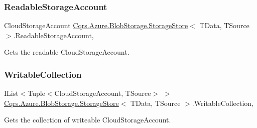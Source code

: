 \subsubsection{\texorpdfstring{Readable\+Storage\+Account}{ReadableStorageAccount}}
{\footnotesize\ttfamily Cloud\+Storage\+Account \hyperlink{classCqrs_1_1Azure_1_1BlobStorage_1_1StorageStore}{Cqrs.\+Azure.\+Blob\+Storage.\+Storage\+Store}$<$ T\+Data, T\+Source $>$.Readable\+Storage\+Account\hspace{0.3cm}{\ttfamily [get]}, {\ttfamily [protected]}}



Gets the readable Cloud\+Storage\+Account. 

\mbox{\label{classCqrs_1_1Azure_1_1BlobStorage_1_1StorageStore_aece11e874587ca60913d275079dfc13c_aece11e874587ca60913d275079dfc13c}} 
\subsubsection{\texorpdfstring{Writable\+Collection}{WritableCollection}}
{\footnotesize\ttfamily I\+List$<$Tuple$<$Cloud\+Storage\+Account, T\+Source$>$ $>$ \hyperlink{classCqrs_1_1Azure_1_1BlobStorage_1_1StorageStore}{Cqrs.\+Azure.\+Blob\+Storage.\+Storage\+Store}$<$ T\+Data, T\+Source $>$.Writable\+Collection\hspace{0.3cm}{\ttfamily [get]}, {\ttfamily [protected]}}



Gets the collection of writeable Cloud\+Storage\+Account. 

